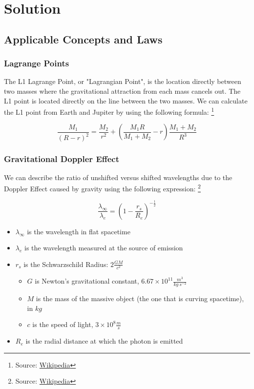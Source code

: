 \documentclass[]{report}
\begin{document}
  \chapter{Solution}
    \section{Applicable Concepts and Laws}
      \subsection{Lagrange Points}
      The L1 Lagrange Point, or "Lagrangian Point", is the location directly between two masses where the gravitational attraction from each mass cancels out. The L1 point is located directly on the line between the two masses. We can calculate the L1 point from Earth and Jupiter by using the following formula: \footnote{Source: \href{https://en.wikipedia.org/wiki/Lagrangian_point\#L1}{Wikipedia}}

      $$ \frac{M_1}{(R-r)^2} = \frac{M_2}{r^2} + \left( \frac{M_1 R}{M_1 + M_2} - r\right) \frac{M_1 + M_2}{R^3}$$

      \subsection{Gravitational Doppler Effect}
      We can describe the ratio of unshifted versus shifted wavelengths due to the Doppler Effect caused by gravity using the following expression: \footnote{Source: \href{https://en.wikipedia.org/wiki/Gravitational_redshift\#Prediction_by_the_equivalence_principle_and_general_relativity}{Wikipedia}}

      $$\frac{\lambda_\infty}{\lambda_e} = \left(1 - \frac{r_s}{R_e} \right)^{-\frac{1}{2}}$$

      \begin{itemize}
        \item $\lambda_\infty$ is the wavelength in flat spacetime
        \item $\lambda_e$ is the wavelength measured at the source of emission
        \item $r_s$ is the Schwarzschild Radius: $2\frac{GM}{c^2}$
        \begin{itemize}
          \item $G$ is Newton's gravitational constant, $6.67\times10^{11} \frac{m^3}{kg\ s^{-2}}$
          \item $M$ is the mass of the massive object (the one that is curving spacetime), in $kg$
          \item $c$ is the speed of light, $3\times10^8 \frac{m}{s}$
          \end{itemize}
        \item $R_e$ is the radial distance at which the photon is emitted
        \end{itemize}
\end{document}
